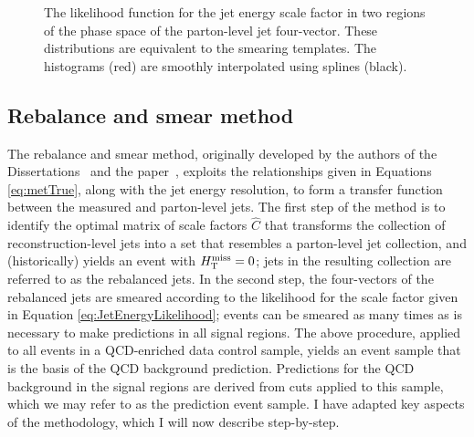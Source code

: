 \begin{figure}[h]
\centering
{}
\caption{The likelihood function for the jet energy scale factor in two regions of the phase space of the parton-level jet four-vector. These distributions are equivalent to the smearing templates. The histograms (red) are smoothly interpolated using splines (black).}
\label{fig:SmearEx}
\end{figure}


\subsection{Rebalance and smear method}
The rebalance and smear method, originally developed by the authors of the Dissertations~\cite{Koay:2011qqa}\cite{Schroder:2012lqa}\cite{Goebel:2015kca} and the paper~\cite{Chatrchyan:2014lfa}, exploits the relationships given in Equations \ref{eq:metTrue}, along with the jet energy resolution, to form a transfer function between the measured and parton-level jets. The first step of the method is to identify the optimal matrix of scale factors $\hat{C}$ that transforms the collection of reconstruction-level jets into a set that resembles a parton-level jet collection, and (historically) yields an event with $H_{\text{T}}^{\rm miss}=0$; jets in the resulting collection are referred to as the rebalanced jets. In the second step, the four-vectors of the rebalanced jets are smeared according to the likelihood for the scale factor given in Equation \ref{eq:JetEnergyLikelihood}; events can be smeared as many times as is necessary to make predictions in all signal regions. The above procedure, applied to all events in a QCD-enriched data control sample, yields an event sample that is the basis of the QCD background prediction. Predictions for the QCD background in the signal regions are derived from cuts applied to this sample, which we may refer to as the prediction event sample. I have adapted key aspects of the methodology, which I will now describe step-by-step.

